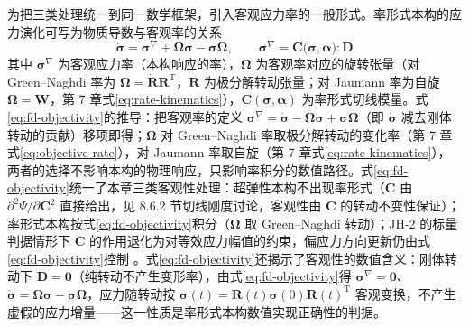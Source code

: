 为把三类处理统一到同一数学框架，引入客观应力率的一般形式。率形式本构的应力演化可写为物质导数与客观率的关系
\begin{equation}
  \dot{\boldsymbol{\sigma}}
  =\boldsymbol{\sigma}^{\nabla}+\boldsymbol{\Omega}\boldsymbol{\sigma}-\boldsymbol{\sigma}\boldsymbol{\Omega},
  \qquad
  \boldsymbol{\sigma}^{\nabla}=\mathbf{C}\bigl(\boldsymbol{\sigma},\boldsymbol{\alpha}\bigr):\mathbf{D}
  \label{eq:fd-objectivity}
\end{equation}
其中 $\boldsymbol{\sigma}^{\nabla}$ 为客观应力率（本构响应的率），$\boldsymbol{\Omega}$ 为客观率对应的旋转张量（对 Green--Naghdi 率为 $\boldsymbol{\Omega}=\dot{\mathbf{R}}\mathbf{R}^{\mathrm{T}}$，$\mathbf{R}$ 为极分解转动张量；对 Jaumann 率为自旋 $\boldsymbol{\Omega}=\mathbf{W}$，第 7 章式\eqref{eq:rate-kinematics}），$\mathbf{C}(\boldsymbol{\sigma},\boldsymbol{\alpha})$ 为率形式切线模量。式\eqref{eq:fd-objectivity}的推导：把客观率的定义 $\boldsymbol{\sigma}^{\nabla}=\dot{\boldsymbol{\sigma}}-\boldsymbol{\Omega}\boldsymbol{\sigma}+\boldsymbol{\sigma}\boldsymbol{\Omega}$（即 $\dot{\boldsymbol{\sigma}}$ 减去刚体转动的贡献）移项即得；$\boldsymbol{\Omega}$ 对 Green--Naghdi 率取极分解转动的变化率（第 7 章式\eqref{eq:objective-rate}），对 Jaumann 率取自旋（第 7 章式\eqref{eq:rate-kinematics}），两者的选择不影响本构的物理响应，只影响率积分的数值路径。式\eqref{eq:fd-objectivity}统一了本章三类客观性处理：超弹性本构不出现率形式（$\mathbf{C}$ 由 $\partial^{2}\Psi/\partial\mathbf{C}^{2}$ 直接给出，见 8.6.2 节切线刚度讨论，客观性由 $\mathbf{C}$ 的转动不变性保证）；率形式本构按式\eqref{eq:fd-objectivity}积分（$\boldsymbol{\Omega}$ 取 Green--Naghdi 转动）；JH-2 的标量判据情形下 $\mathbf{C}$ 的作用退化为对等效应力幅值的约束，偏应力方向更新仍由式\eqref{eq:fd-objectivity}控制 \cite{FlanaganTaylor1987,Warren2009}。式\eqref{eq:fd-objectivity}还揭示了客观性的数值含义：刚体转动下 $\mathbf{D}=\mathbf{0}$（纯转动不产生变形率），由式\eqref{eq:fd-objectivity}得 $\boldsymbol{\sigma}^{\nabla}=\mathbf{0}$、$\dot{\boldsymbol{\sigma}}=\boldsymbol{\Omega}\boldsymbol{\sigma}-\boldsymbol{\sigma}\boldsymbol{\Omega}$，应力随转动按 $\boldsymbol{\sigma}(t)=\mathbf{R}(t)\boldsymbol{\sigma}(0)\mathbf{R}(t)^{\mathrm{T}}$ 客观变换，不产生虚假的应力增量——这一性质是率形式本构数值实现正确性的判据。

